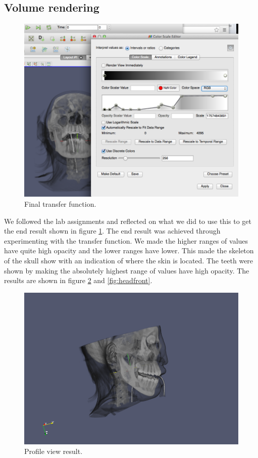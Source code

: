 \documentclass[a4paper]{article}
\begin{document}
\subsection{Volume rendering}
\begin{figure}[H]
    \includegraphics[width=1\linewidth]{lab5/head-transfer-function.png}
    \caption{Final transfer function.}
    \label{fig:volume}
\end{figure}
We followed the lab assignments and reflected on what we did to use this to get
the end result shown in figure \ref{fig:volume}. The end result was achieved through
experimenting with the transfer function. We made the higher ranges of values
have quite high opacity and the lower ranges have lower. This made the skeleton
of the skull show with an indication of where the skin is located. The teeth
were shown by making the absolutely highest range of values have high opacity. The results are shown in figure \ref{fig:headprof} and \ref{fig:headfront}.

\begin{figure}[H]
    \includegraphics[width=1\linewidth]{lab5/head-profile-screenshot.png}
    \caption{Profile view result.}
    \label{fig:headprof}
\end{figure}
\end{document}
